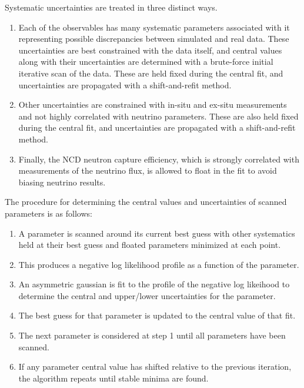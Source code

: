 Systematic uncertainties are treated in three distinct ways.
\begin{enumerate}
\item Each of the observables has many systematic parameters associated with it representing possible discrepancies between simulated and real data. These uncertainties are best constrained with the data itself, and central values along with their uncertainties are determined with a brute-force initial iterative scan of the data. These are held fixed during the central fit, and uncertainties are propagated with a shift-and-refit method.
\item Other uncertainties are constrained with in-situ and ex-situ measurements and not highly correlated with neutrino parameters. These are also held fixed during the central fit, and uncertainties are propagated with a shift-and-refit method.
\item Finally, the NCD neutron capture efficiency, which is strongly correlated with measurements of the neutrino flux, is allowed to float in the fit to avoid biasing neutrino results.
\end{enumerate}

The procedure for determining the central values and uncertainties of scanned parameters is as follows:
\begin{enumerate}
\item A parameter is scanned around its current best guess with other systematics held at their best guess and floated parameters minimized at each point.
\item This produces a negative log likelihood profile as a function of the parameter.
\item An asymmetric gaussian is fit to the profile of the negative log likeihood to determine the central and upper/lower uncertainties for the parameter.
\item The best guess for that parameter is updated to the central value of that fit.
\item The next parameter is considered at step 1 until all parameters have been scanned.
\item If any parameter central value has shifted relative to the previous iteration, the algorithm repeats until stable minima are found.
\end{enumerate}

